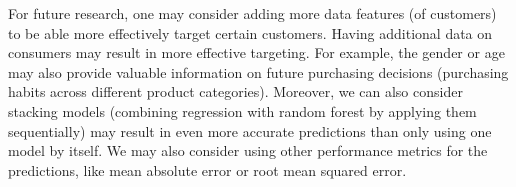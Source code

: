 For future research, one may consider adding more data features (of customers)
to be able more effectively target certain customers. Having additional data on
consumers may result in more effective targeting. For example, the gender or age
may also provide valuable information on future purchasing decisions (purchasing
habits across different product categories). Moreover,
we can also consider stacking models (combining regression with random forest by
applying them sequentially) may result in even more accurate predictions than
only using one model by itself. We may also consider using other performance
metrics for the predictions, like mean absolute error or root mean squared
error.
